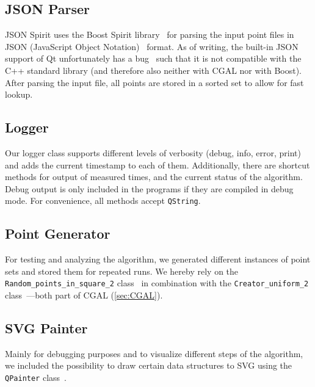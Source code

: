 \subsection{JSON Parser}
\label{sec:json_parser}
JSON Spirit \cite{json_spirit} uses the Boost Spirit
library~\cite{boost_spirit} for parsing the input point files in
JSON (JavaScript Object Notation)~\cite{json} format. As of writing,
the built-in JSON support of Qt unfortunately has a
bug~\cite{json_bug} such that it is not compatible with the C++
standard library (and therefore also neither with CGAL nor with
Boost). After parsing the input file, all points are stored in a
sorted set to allow for fast lookup.

\subsection{Logger}
\label{sec:logger}
Our logger class supports different levels of verbosity
(debug, info, error, print) and adds the current timestamp to each
of them. Additionally, there are shortcut methods for output of
measured times, and the current status of the algorithm. Debug output
is only included in the programs if they are compiled in debug mode.
For convenience, all methods accept \verb|QString|.

\subsection{Point Generator}
For testing and analyzing the algorithm, we generated different
instances of point sets and stored them for repeated runs. We hereby
rely on the \verb|Random_points_in_square_2| 
class~\cite{cgal_manual_random_points} in combination with the
\verb|Creator_uniform_2| class~\cite{cgal_manual_creator_uniform}---both
part of CGAL (\cref{sec:CGAL}).

\subsection{SVG Painter}
\label{sec:svg_painter}
Mainly for debugging purposes and to visualize different steps of the
algorithm, we included the possibility to draw certain data structures
to SVG using the \verb|QPainter| class~\cite{qt_manual_qpainter}.

